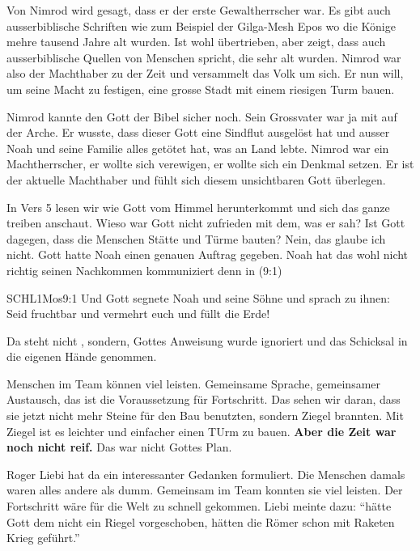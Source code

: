 \documentclass[fontsize=16pt]{mybib}
\begin{document}
\begin{otsblock}
    Von Nimrod wird gesagt, dass er der erste Gewaltherrscher war. Es gibt auch ausserbiblische Schriften wie zum Beispiel der Gilga-Mesh Epos wo die Könige mehre tausend Jahre alt wurden. Ist wohl übertrieben, aber zeigt, dass auch ausserbiblische Quellen von Menschen spricht, die sehr alt wurden. Nimrod war also der Machthaber zu der Zeit und versammelt das Volk um sich. Er nun will, um seine Macht zu festigen, eine grosse Stadt mit einem riesigen Turm bauen.
\end{otsblock}
\begin{otsblock}
    Nimrod kannte den Gott der Bibel sicher noch. Sein Grossvater war ja mit auf der Arche. Er wusste, dass dieser Gott eine Sindflut ausgelöst hat und ausser Noah und seine Familie alles getötet hat, was an Land lebte. Nimrod war ein Machtherrscher, er wollte sich verewigen, er wollte sich ein Denkmal setzen. Er ist der aktuelle Machthaber und fühlt sich diesem unsichtbaren Gott überlegen.
\end{otsblock}
\begin{otsblock}
    In Vers 5 lesen wir wie Gott vom Himmel herunterkommt und sich das ganze treiben anschaut. Wieso war Gott nicht zufrieden mit dem, was er sah? Ist Gott dagegen, dass die Menschen Stätte und Türme bauten? Nein, das glaube ich nicht. Gott hatte Noah einen genauen Auftrag gegeben. Noah hat das wohl nicht richtig seinen Nachkommen kommuniziert denn in (9:1)
    \begin{bibelbox}{SCHL}{1Mos}{9:1}
        Und Gott segnete Noah und seine Söhne und sprach zu ihnen: Seid fruchtbar und vermehrt euch und füllt die Erde!
    \end{bibelbox}    
    
    Da steht nicht , sondern,  Gottes Anweisung wurde ignoriert und das Schicksal in die eigenen Hände genommen. 
\end{otsblock}
\begin{otsblock}
    Menschen im Team können viel leisten. Gemeinsame Sprache, gemeinsamer Austausch, das ist die Voraussetzung für Fortschritt. Das sehen wir daran, dass sie jetzt nicht mehr Steine für den Bau benutzten, sondern Ziegel brannten. Mit Ziegel ist es leichter und einfacher einen TUrm zu bauen. \textbf{Aber die Zeit war noch nicht reif.} Das war nicht Gottes Plan.
\end{otsblock}
\begin{otsblock}
    Roger Liebi hat da ein interessanter Gedanken formuliert. Die Menschen damals waren alles andere als dumm. Gemeinsam im Team konnten sie viel leisten. Der Fortschritt wäre für die Welt zu schnell gekommen. Liebi meinte dazu: \enquote{hätte Gott dem nicht ein Riegel vorgeschoben, hätten die Römer schon mit Raketen Krieg geführt.}
\end{otsblock}
\end{document}
